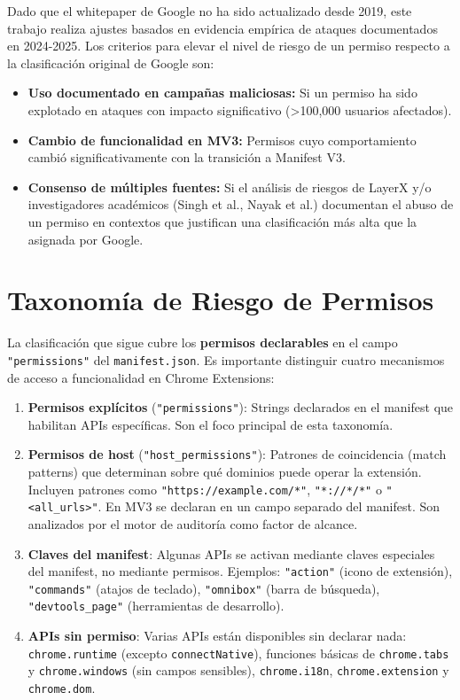 \documentclass[12pt,oneside]{report}
\begin{document}
Dado que el whitepaper de Google no ha sido actualizado desde 2019, este trabajo realiza ajustes basados en evidencia empírica de ataques documentados en 2024-2025. Los criterios para elevar el nivel de riesgo de un permiso respecto a la clasificación original de Google son:

\begin{itemize}
    \item \textbf{Uso documentado en campañas maliciosas:} Si un permiso ha sido explotado en ataques con impacto significativo (>100,000 usuarios afectados).
    \item \textbf{Cambio de funcionalidad en MV3:} Permisos cuyo comportamiento cambió significativamente con la transición a Manifest V3.
    \item \textbf{Consenso de múltiples fuentes:} Si el análisis de riesgos de LayerX y/o investigadores académicos (Singh et al., Nayak et al.) documentan el abuso de un permiso en contextos que justifican una clasificación más alta que la asignada por Google.
\end{itemize}

\section{Taxonomía de Riesgo de Permisos}

La clasificación que sigue cubre los \textbf{permisos declarables} en el campo \texttt{"permissions"} del \texttt{manifest.json}. Es importante distinguir cuatro mecanismos de acceso a funcionalidad en Chrome Extensions:

\begin{enumerate}
    \item \textbf{Permisos explícitos} (\texttt{"permissions"}): Strings declarados en el manifest que habilitan APIs específicas. Son el foco principal de esta taxonomía.
    \item \textbf{Permisos de host} (\texttt{"host\_permissions"}): Patrones de coincidencia (match patterns) que determinan sobre qué dominios puede operar la extensión. Incluyen patrones como \texttt{"https://example.com/*"}, \texttt{"*://*/*"} o \texttt{"<all\_urls>"}. En MV3 se declaran en un campo separado del manifest. Son analizados por el motor de auditoría como factor de alcance.
    \item \textbf{Claves del manifest}: Algunas APIs se activan mediante claves especiales del manifest, no mediante permisos. Ejemplos: \texttt{"action"} (icono de extensión), \texttt{"commands"} (atajos de teclado), \texttt{"omnibox"} (barra de búsqueda), \texttt{"devtools\_page"} (herramientas de desarrollo).
    \item \textbf{APIs sin permiso}: Varias APIs están disponibles sin declarar nada: \texttt{chrome.runtime} (excepto \texttt{connectNative}), funciones básicas de \texttt{chrome.tabs} y \texttt{chrome.windows} (sin campos sensibles), \texttt{chrome.i18n}, \texttt{chrome.extension} y \texttt{chrome.dom}.
\end{enumerate}
\end{document}
